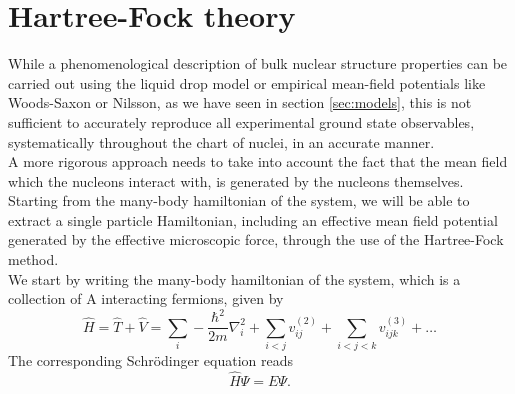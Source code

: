 \section{Hartree-Fock theory}
\label{sec:hf}
While a phenomenological description of bulk nuclear structure properties can be carried out using the liquid drop model or empirical mean-field potentials like Woods-Saxon or Nilsson, as we have seen in section \ref{sec:models}, this is not sufficient to accurately reproduce all experimental ground state observables, systematically throughout the chart of nuclei, in an accurate manner. 
\\A more rigorous approach needs to take into account the fact that the mean field which the nucleons interact with, is generated by the nucleons themselves.
Starting from the many-body hamiltonian of the system, we will be able to extract a single particle Hamiltonian, including an effective mean field potential generated by the effective microscopic force, through the use of the Hartree-Fock method.
\\We start by writing the many-body hamiltonian of the system, which is a collection of A interacting fermions, given by
\begin{equation}
    \label{eq:mb_hamiltonian}
    \hat H = \hat T + \hat V = \sum_i -\frac{\hbar^2}{2m}\nabla^2_i + \sum_{i<j} v^{(2)}_{ij} + \sum_{i<j<k} v^{(3)}_{ijk }+\ldots
\end{equation}
The corresponding Schr\"odinger equation reads
\begin{equation}
    \label{eq:many_body_schrodinger}
    \hat H \Psi = E\Psi.
\end{equation}
